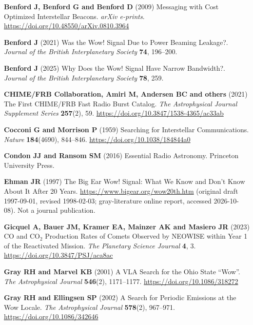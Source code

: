 \documentclass[crop]{CSL}
\begin{document}
\begin{thebibliography}{}
\textbf{Benford J, Benford G and Benford D} (2009) Messaging with Cost Optimized Interstellar Beacons. \textit{arXiv e-prints}. \url{https://doi.org/10.48550/arXiv.0810.3964}

\textbf{Benford J} (2021) Was the Wow! Signal Due to Power Beaming Leakage?. \textit{Journal of the British Interplanetary Society} \textbf{74}, 196--200.

\textbf{Benford J} (2025) Why Does the Wow! Signal Have Narrow Bandwidth?. \textit{Journal of the British Interplanetary Society} \textbf{78}, 259.

\textbf{CHIME/FRB Collaboration, Amiri M, Andersen BC and others} (2021) The First CHIME/FRB Fast Radio Burst Catalog. \textit{The Astrophysical Journal Supplement Series} \textbf{257}(2), 59. \url{https://doi.org/10.3847/1538-4365/ac33ab}

\textbf{Cocconi G and Morrison P} (1959) Searching for Interstellar Communications. \textit{Nature} \textbf{184}(4690), 844--846. \url{https://doi.org/10.1038/184844a0}

\textbf{Condon JJ and Ransom SM} (2016) Essential Radio Astronomy. Princeton University Press.

\textbf{Ehman JR} (1997) The Big Ear Wow! Signal: What We Know and Don't Know About It After 20 Years. \url{https://www.bigear.org/wow20th.htm} (original draft 1997-09-01, revised 1998-02-03; gray-literature online report, accessed 2026-10-08). Not a journal publication.

\textbf{Gicquel A, Bauer JM, Kramer EA, Mainzer AK and Masiero JR} (2023) CO and CO$_2$ Production Rates of Comets Observed by NEOWISE within Year 1 of the Reactivated Mission. \textit{The Planetary Science Journal} \textbf{4}, 3. \url{https://doi.org/10.3847/PSJ/aca8ac}

\textbf{Gray RH and Marvel KB} (2001) A VLA Search for the Ohio State ``Wow''. \textit{The Astrophysical Journal} \textbf{546}(2), 1171--1177. \url{https://doi.org/10.1086/318272}

\textbf{Gray RH and Ellingsen SP} (2002) A Search for Periodic Emissions at the Wow Locale. \textit{The Astrophysical Journal} \textbf{578}(2), 967--971. \url{https://doi.org/10.1086/342646}


\end{thebibliography}
\end{document}
